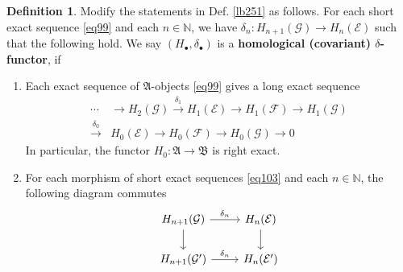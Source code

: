 \documentclass[12pt,b5paper,notitlepage]{report}
\theoremstyle{definition}
\newtheorem{df}{Definition}[section]
\theoremstyle{plain}
\newcommand{\fk}{\mathfrak}
\newcommand{\mc}{\mathcal}
\newcommand{\blt}{\bullet}
\newcommand{\Nbb}{\mathbb N}
\numberwithin{equation}{section}
\begin{document}
\begin{df}
Modify the statements in Def. \ref{lb251} as follows. For each short exact sequence \eqref{eq99} and each $n\in\Nbb$, we have $\delta_n:H_{n+1}(\mc G)\rightarrow H_n(\mc E)$ such that the following hold. We say $(H_\blt,\delta_\blt)$ is a \textbf{homological (covariant) $\delta$-functor}, if
\begin{enumerate}[label=(\arabic*)]
\item Each exact sequence of $\fk A$-objects \eqref{eq99} gives a long exact sequence 
\begin{align*}
\cdots&\rightarrow H_2(\mc G)\xrightarrow{\delta_1} H_1(\mc E)\rightarrow H_1(\mc F)\rightarrow H_1(\mc G)\\
\xrightarrow{\delta_0} &H_0(\mc E)\rightarrow H_0(\mc F)\rightarrow H_0(\mc G)\rightarrow 0
\end{align*}
In particular, the functor $H_0:\fk A\rightarrow\fk B$ is right exact.
\item For each morphism of short exact sequences \eqref{eq103} and each $n\in\Nbb$, the following diagram commutes
\begin{equation*}
\begin{tikzcd}
H_{n+1}(\mc G) \arrow[r,"\delta_n"] \arrow[d] & H_n(\mc E) \arrow[d] \\
H_{n+1}(\mc G') \arrow[r,"\delta_n"]           & H_n(\mc E')          
\end{tikzcd}
\end{equation*}
\end{enumerate}
\end{df}
\end{document}
